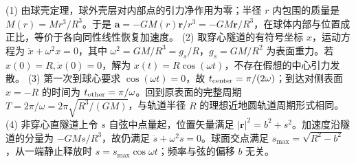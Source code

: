 (1) 由球壳定理，球外壳层对内部点的引力净作用为零；半径 \(r\) 内包围的质量是 \(M(r)=Mr^3/R^3\)。于是 \(\mathbf a=-GM(r)\mathbf r/r^3=-GM\mathbf r/R^3\)，在球体内部与位置成正比，等价于各向同性线性恢复加速度。
(2) 取穿心隧道的有符号坐标 \(x\)，运动方程为 \(\ddot x+\omega^2x=0\)，其中 \(\omega^2=GM/R^3=g_s/R\)，\(g_s=GM/R^2\) 为表面重力。若 \(x(0)=R,\dot x(0)=0\)，解为 \(x(t)=R\cos(\omega t)\)，不存在假想的中心引力发散。
(3) 第一次到球心要求 \(\cos(\omega t)=0\)，故 \(t_{\rm center}=\pi/(2\omega)\)；到达对侧表面 \(x=-R\) 的时间为 \(t_{\rm other}=\pi/\omega\)。回到原表面的完整周期 \(T=2\pi/\omega=2\pi\sqrt{R^3/(GM)}\)，与轨道半径 \(R\) 的理想近地圆轨道周期形式相同。
(4) 非穿心直隧道上令 \(s\) 自弦中点量起，位置矢量满足 \(|\mathbf r|^2=b^2+s^2\)。加速度沿隧道的分量为 \(-GMs/R^3\)，故仍满足 \(\ddot s+\omega^2s=0\)。球面交点满足 \(s_{\max}=\sqrt{R^2-b^2}\)，从一端静止释放时 \(s=s_{\max}\cos\omega t\)；频率与弦的偏移 \(b\) 无关。
